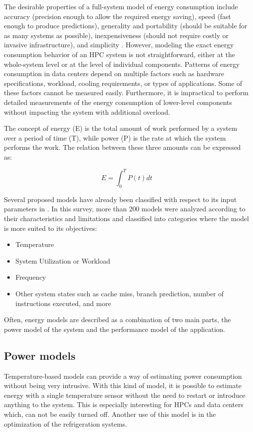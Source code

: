 The desirable properties of a full-system model of energy consumption include accuracy (precision enough to allow the required energy saving), speed (fast enough to produce predictions), generality and portability (should be suitable for as many systems as possible), inexpensiveness (should not require costly or invasive infrastructure), and simplicity \cite{Rivoire2008AModels}. However, modeling the exact energy consumption behavior of an HPC system is not straightforward, either at the whole-system level or at the level of individual components. Patterns of energy consumption in data centers depend on multiple factors such as hardware specifications, workload, cooling requirements, or types of applications. Some of these factors cannot be measured easily. Furthermore, it is impractical to perform detailed measurements of the energy consumption of lower-level components without impacting the system with additional overload.

The concept of energy (E) is the total amount of work performed by a system over a period of time (T), while power (P) is the rate at which the system performs the work. The relation between these three amounts can be expressed as:

\begin{equation}
E = \int_{0}^{T}P(t)dt
\label{qe:energy_definition_cont}
\end{equation}

Several proposed models have already been classified with respect to its input parameters in \cite{Dayarathna2016DataSurvey}. In this survey, more than 200 models were analyzed according to their characteristics and limitations and classified into categories where the model is more suited to its objectives:
\begin{itemize}
	\item Temperature
	\item System Utilization or Workload
	\item Frequency
	\item Other system states such as cache miss, branch prediction, number of instructions executed, and more
	\label{tab:input_type}
\end{itemize}

Often, energy models are described as a combination of two main parts, the power model of the system and the performance model of the application. 

\subsection{Power models}
Temperature-based models\cite{ZhangEnergyInfrastructure} can provide a way of estimating power consumption without being very intrusive. With this kind of model, it is possible to estimate energy with a single temperature sensor without the need to restart or introduce anything to the system. This is especially interesting for HPCs and data centers which, can not be easily turned off. Another use of this model is in the optimization of the refrigeration systems.


